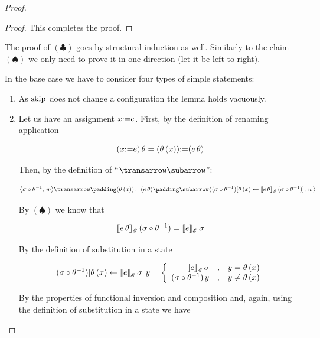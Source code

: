 \begin{proof}
\begin{proof}
    This completes the proof.
  \end{proof}

  The proof of $(\clubsuit)$ goes by structural induction as well. Similarly to the claim $(\spadesuit)$ we only need to prove it in
  one direction (let it be left-to-right).

  In the base case we have to consider four types of simple statements:

  \begin{enumerate}
  \item As $\llang{skip}$ does not change a configuration the lemma holds vacuously.
  \item Let us have an assignment $x\llang{:=}e$. First, by the definition of renaming application

    \[
    (x\llang{:=}e)\,\theta=(\theta\,(x))\llang{:=}(e\,\theta)
    \]

    Then, by the definition of ``$\transrel$'':
    
    \[
    \trans{\inbr{\sigma\circ\theta^{-1},\,w}}{(\theta\,(x))\llang{:=}(e\,\theta)}{\inbr{(\sigma\circ\theta^{-1})[\theta\,(x)\gets\sembr{e\,\theta}^\ph_\mathscr{E}\,(\sigma\circ\theta^{-1})],\,w}}
    \]

    By $(\spadesuit)$ we know that

    \[
    \sembr{e\,\theta}^\ph_\mathscr{E}\,(\sigma\circ\theta^{-1})=\sembr{e}^\ph_\mathscr{E}\,\sigma
    \]

    By the definition of substitution in a state

    \[
    (\sigma\circ\theta^{-1})[\theta\,(x)\gets\sembr{e}^\ph_\mathscr{E}\,\sigma]\,y=\left\{\begin{array}{rcl}
                                                                                         \sembr{e}^\ph_\mathscr{E}\,\sigma&,&y=\theta\,(x)\\
                                                                                         (\sigma\circ\theta^{-1})\,y&,&y\ne\theta\,(x)
                                                                                       \end{array}\right.
    \]

    By the properties of functional inversion and composition and, again, using the definition of substitution in a state we have


\end{enumerate}
\end{proof}

